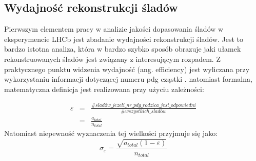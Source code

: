\subsection{Wydajność rekonstrukcji śladów}
Pierwszym elementem pracy w analizie jakości dopasowania śladów w eksperymencie LHCb jest zbadanie wydajności rekonstrukcji śladów. Jest to bardzo istotna analiza, która w bardzo szybko sposób obrazuje jaki ułamek rekonstruowanych śladów jest związany z interesującym rozpadem. Z praktycznego punktu widzenia wydajność (ang. efficiency) jest wyliczana przy wykorzystaniu informacji dotyczącej numeru pdg cząstki \cite{PDG}. natomiast formalna, matematyczna definicja jest realizowana przy użyciu zależności:

\begin{eqnarray}
\varepsilon &=& \frac{\# sladów\_jezeli\_nr\_pdg\_rodzica\_jest\_odpowiedni }{\# wszystkich\_sladów} \\ \nonumber &=&\frac{a_{total}}{n_{total}}
\end{eqnarray}
Natomiast niepewność wyznaczenia tej wielkości przyjmuje się jako:
\begin{equation}
\sigma_{\varepsilon}=\frac{\sqrt{a_{total}(1-\varepsilon)}}{n_{total}}
\end{equation}

